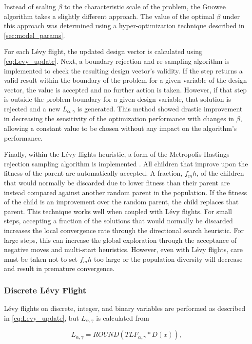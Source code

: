 \documentclass{article}                                                                           %
\begin{document}
Instead of scaling $\beta$ to the characteristic scale of the problem, the Gnowee algorithm takes a slightly different approach.
The value of the optimal $\beta$ under this approach was determined using a hyper-optimization technique described in \autoref{sec:model_params}.

For each Lévy flight, the updated design vector is calculated using \autoref{eq:Levy_update}. 
Next, a boundary rejection and re-sampling algorithm is implemented to check the resulting design vector's validity. 
If the step returns a valid result within the boundary of the problem for a given variable of the design vector, the value is accepted and no further action is taken.
However, if that step is outside the problem boundary for a given design variable, that solution is rejected and a new $L_{\alpha,\gamma}$ is generated.  
This method showed drastic improvement in decreasing the sensitivity of the optimization performance with changes in $\beta$, allowing a constant value to be chosen without any impact on the algorithm's performance. 

Finally, within the Lévy flights heuristic, a form of the Metropolis-Hastings rejection sampling algorithm is implemented \cite{Hastings1970}.  
All children that improve upon the fitness of the parent are automatically accepted.
A fraction, $f_mh$, of the children that would normally be discarded due to lower fitness than their parent are instead compared against another random parent in the population.
If the fitness of the child is an improvement over the random parent, the child replaces that parent.
This technique works well when coupled with Lévy flights.
For small steps, accepting a fraction of the solutions that would normally be discarded increases the local convergence rate through the directional search heuristic.
For large steps, this can increase the global exploration through the acceptance of negative moves and multi-start heuristics.  
However, even with Lévy flights, care must be taken not to set $f_mh$ too large or the population diversity will decrease and result in premature convergence.   

\subsubsection{Discrete Lévy Flight} 
Lévy flights on discrete, integer, and binary variables are performed as described in \autoref{eq:Levy_update}, but $L_{\alpha,\gamma}$ is calculated from

\begin{equation} \label{eq:TLF}
  L_{\alpha,\gamma}=ROUND(TLF_{\alpha,\gamma}*D(x)),
\end{equation}
\end{document}
